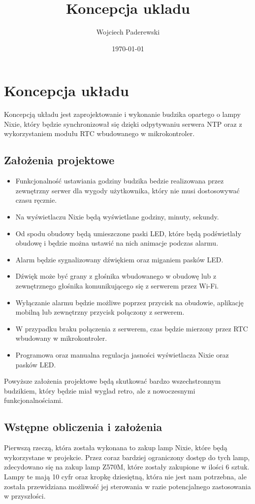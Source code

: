 \documentclass[../main.tex]{subfiles}
\author{Wojciech Paderewski}
\date{\today}
\title{Koncepcja ukladu}
\begin{document}
\section{Koncepcja układu}
Koncepcją układu jest zaprojektowanie i wykonanie budzika opartego o lampy Nixie, który będzie synchronizował się dzięki odpytywaniu serwera NTP oraz
z wykorzystaniem modułu RTC wbudowanego w mikrokontroler.

\subsection{Założenia projektowe}
\begin{itemize}
    \item Funkcjonalność ustawiania godziny budzika bedzie realizowana przez zewnętrzny serwer dla wygody użytkownika, który nie musi dostosowywać czasu ręcznie.
    \item Na wyświetlaczu Nixie będą wyświetlane godziny, minuty, sekundy.
    \item Od spodu obudowy będą umieszczone paski LED, które będą podświetlały obudowę i będzie można ustawić na nich animacje podczas alarmu.
    \item Alarm będzie sygnalizowany dźwiękiem oraz miganiem pasków LED.
    \item Dźwięk może być grany z głośnika wbudowanego w obudowę lub z zewnętrznego głośnika komunikującego się z serwerem przez Wi-Fi.
    \item Wyłączanie alarmu będzie możliwe poprzez przycisk na obudowie, aplikację mobilną lub zewnętrzny przycisk połączony z serwerem.
    \item W przypadku braku połączenia z serwerem, czas będzie mierzony przez RTC wbudowany w mikrokontroler.
    \item Programowa oraz manualna regulacja jasności wyświetlacza Nixie oraz pasków LED.
\end{itemize}

Powyższe założenia projektowe będą skutkować bardzo wszechstronnym budzikiem, który będzie miał wyglad retro,
ale z nowoczesnymi funkcjonalnościami.

\subsection{Wstępne obliczenia i założenia}

Pierwszą rzeczą, która została wykonana to zakup lamp Nixie, które będą wykorzystane w projekcie. 
Przez coraz bardziej ograniczony dostęp do tych lamp, 
zdecydowano się na zakup lamp Z570M, które zostały zakupione w ilości 6 sztuk. Lampy te mają 10 cyfr oraz kropkę dziesiętną,
która nie jest nam potrzebna, ale została przewidziana możliwość jej sterowania w razie potencjalnego zastosowania w przyszłości.
\end{document}

